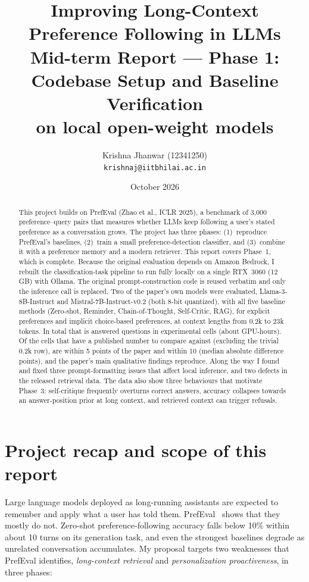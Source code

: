 \documentclass[11pt,a4paper]{article}
\title{\textbf{Improving Long-Context Preference Following in LLMs}\\[2pt]
\large Mid-term Report --- Phase 1: Codebase Setup and Baseline Verification\\
on local open-weight models}
\author{Krishna Jhanwar (12341250)\\ \small\texttt{krishnaj@iitbhilai.ac.in}}
\date{October 2026}
\begin{document}
\maketitle

\begin{abstract}
\noindent
This project builds on PrefEval (Zhao et al., ICLR 2025), a benchmark of 3{,}000 preference--query pairs that measures
whether LLMs keep following a user's stated preference as a conversation grows. The project has three phases: (1)~reproduce
PrefEval's baselines, (2)~train a small preference-detection classifier, and (3)~combine it with a preference memory and a modern
retriever. This report covers Phase~1, which is complete. Because the original evaluation depends on Amazon Bedrock, I rebuilt
the classification-task pipeline to run fully locally on a single RTX~3060 (12\,GB) with Ollama. The original prompt-construction
code is reused verbatim and only the inference call is replaced. Two of the paper's own models were evaluated,
Llama-3-8B-Instruct and Mistral-7B-Instruct-v0.2 (both 8-bit quantized), with all five baseline methods (Zero-shot, Reminder,
Chain-of-Thought, Self-Critic, RAG), for explicit preferences and implicit choice-based preferences, at context lengths from
0.2k to 23k tokens. In total that is \nQuestions{} answered questions in \nCells{} experimental cells (about \gpuHours{} GPU-hours).
Of the \nCompared{} cells that have a published number to compare against (excluding the trivial 0.2k row), \nWithinFive{} are within
5 points of the paper and \nWithinTen{} within 10 (median absolute difference \medianAbsDelta{} points), and the paper's main
qualitative findings reproduce. Along the way I found and fixed three prompt-formatting issues that affect local inference, and two
defects in the released retrieval data. The data also show three behaviours that motivate Phase~3: self-critique frequently
overturns correct answers, accuracy collapses towards an answer-position prior at long context, and retrieved context can
trigger refusals.
\end{abstract}

\tableofcontents
\newpage

\section{Project recap and scope of this report}

Large language models deployed as long-running assistants are expected to remember and apply what a user has told them.
PrefEval~\cite{prefeval} shows that they mostly do not. Zero-shot preference-following accuracy falls below 10\% within about
10 turns on its generation task, and even the strongest baselines degrade as unrelated conversation accumulates.
My proposal targets two weaknesses that PrefEval identifies, \emph{long-context retrieval} and \emph{personalization
proactiveness}, in three phases:
\end{document}
